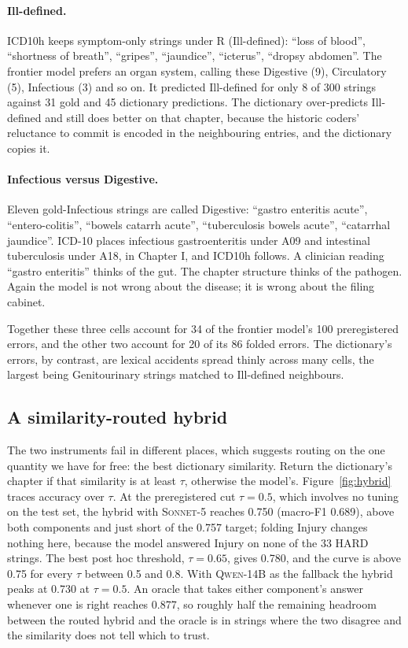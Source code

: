 \documentclass[11pt]{article}
\newcommand{\Mcomm}{\textsc{Sonnet-5}}
\newcommand{\Mlocal}{\textsc{Qwen-14B}}
\begin{document}
\paragraph{Ill-defined.} ICD10h keeps symptom-only strings under R (Ill-defined): ``loss of blood'', ``shortness of breath'', ``gripes'', ``jaundice'', ``icterus'', ``dropsy abdomen''. The frontier model prefers an organ system, calling these Digestive (9), Circulatory (5), Infectious (3) and so on. It predicted Ill-defined for only 8 of 300 strings against 31 gold and 45 dictionary predictions. The dictionary over-predicts Ill-defined and still does better on that chapter, because the historic coders' reluctance to commit is encoded in the neighbouring entries, and the dictionary copies it.

\paragraph{Infectious versus Digestive.} Eleven gold-Infectious strings are called Digestive: ``gastro enteritis acute'', ``entero-colitis'', ``bowels catarrh acute'', ``tuberculosis bowels acute'', ``catarrhal jaundice''. ICD-10 places infectious gastroenteritis under A09 and intestinal tuberculosis under A18, in Chapter I, and ICD10h follows. A clinician reading ``gastro enteritis'' thinks of the gut. The chapter structure thinks of the pathogen. Again the model is not wrong about the disease; it is wrong about the filing cabinet.

Together these three cells account for 34 of the frontier model's 100 preregistered errors, and the other two account for 20 of its 86 folded errors. The dictionary's errors, by contrast, are lexical accidents spread thinly across many cells, the largest being Genitourinary strings matched to Ill-defined neighbours.

\subsection{A similarity-routed hybrid}
\label{sec:routing}

The two instruments fail in different places, which suggests routing on the one quantity we have for free: the best dictionary similarity. Return the dictionary's chapter if that similarity is at least $\tau$, otherwise the model's. Figure~\ref{fig:hybrid} traces accuracy over $\tau$. At the preregistered cut $\tau=0.5$, which involves no tuning on the test set, the hybrid with \Mcomm{} reaches 0.750 (macro-F1 0.689), above both components and just short of the 0.757 target; folding Injury changes nothing here, because the model answered Injury on none of the 33 HARD strings. The best post hoc threshold, $\tau=0.65$, gives 0.780, and the curve is above 0.75 for every $\tau$ between 0.5 and 0.8. With \Mlocal{} as the fallback the hybrid peaks at 0.730 at $\tau=0.5$. An oracle that takes either component's answer whenever one is right reaches 0.877, so roughly half the remaining headroom between the routed hybrid and the oracle is in strings where the two disagree and the similarity does not tell which to trust.
\end{document}
